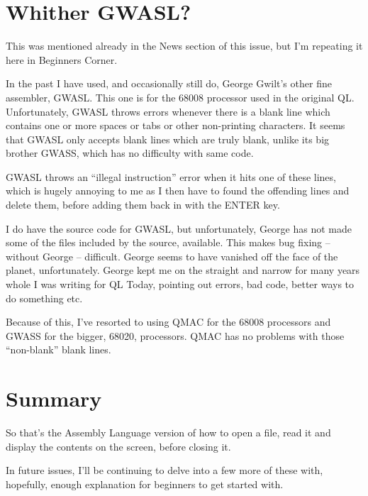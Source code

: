 \section{Whither GWASL?}

This was mentioned already in the News section of this issue, but
I'm repeating it here in Beginners Corner.

In the past I have used, and occasionally still do, George Gwilt's
other fine assembler, GWASL. This one is for the 68008 processor used
in the original QL. Unfortunately, GWASL throws errors whenever there
is a blank line which contains one or more spaces or tabs or other
non-printing characters. It seems that GWASL only accepts blank lines
which are truly blank, unlike its big brother GWASS, which has no
difficulty with same code.

GWASL throws an ``illegal instruction'' error when it hits one of
these lines, which is hugely annoying to me as I then have to found
the offending lines and delete them, before adding them back in with
the ENTER key.

I do have the source code for GWASL, but unfortunately, George has
not made some of the files included by the source, available. This
makes bug fixing -- without George -- difficult. George seems to
have vanished off the face of the planet, unfortunately. George kept
me on the straight and narrow for many years whole I was writing for
QL Today, pointing out errors, bad code, better ways to do something
etc.

Because of this, I've resorted to using QMAC for the 68008 processors
and GWASS for the bigger, 68020, processors. QMAC has no problems
with those ``non-blank'' blank lines.

\section{Summary}

So that's the Assembly Language version of how to open a file, read
it and display the contents on the screen, before closing it.

In future issues, I'll be continuing to delve into a few more of these
with, hopefully, enough explanation for beginners to get started with.

